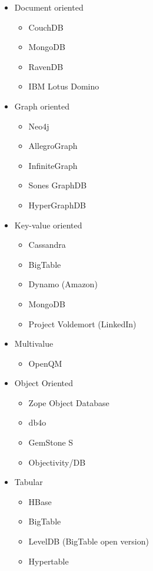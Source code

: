 \begin{itemize}

\item Document oriented

  \begin{itemize}
    \item CouchDB
    \item MongoDB
    \item RavenDB
    \item IBM Lotus Domino
  \end{itemize}

\item Graph oriented

  \begin{itemize}
    \item Neo4j
    \item AllegroGraph
    \item InfiniteGraph
    \item Sones GraphDB
    \item HyperGraphDB
  \end{itemize}

\item Key-value oriented

  \begin{itemize}
    \item Cassandra
    \item BigTable
    \item Dynamo (Amazon)
    \item MongoDB
    \item Project Voldemort (LinkedIn)
  \end{itemize}

\item Multivalue

  \begin{itemize}
    \item OpenQM
  \end{itemize}  

\item Object Oriented
  
  \begin{itemize}
    \item Zope Object Database
    \item db4o
    \item GemStone S
    \item Objectivity/DB
  \end{itemize}

\item Tabular

  \begin{itemize}
    \item HBase
    \item BigTable
    \item LevelDB (BigTable open version)
    \item Hypertable
  \end{itemize}
  

\end{itemize}

